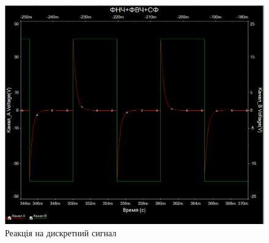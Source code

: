 \documentclass[
  ukrainian,
  14pt
]{extreport}
\begin{document}
\begin{figure}[H]
  \centering
  \includegraphics[width=.6\textwidth]{imgs/FVC-4.png}
  \caption{Реакція на дискретний сигнал}
\end{figure}
\end{document}
